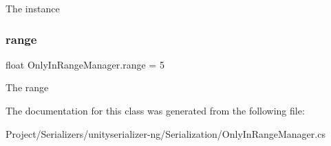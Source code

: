 The instance 

\mbox{\label{class_only_in_range_manager_adebbb2a7204de0f6f5428cb9adeeb3f3}} 
\subsubsection{\texorpdfstring{range}{range}}
{\footnotesize\ttfamily float Only\+In\+Range\+Manager.\+range = 5}



The range 



The documentation for this class was generated from the following file\+:\begin{DoxyCompactItemize}
\item 
Project/\+Serializers/unityserializer-\/ng/\+Serialization/Only\+In\+Range\+Manager.\+cs\end{DoxyCompactItemize}

